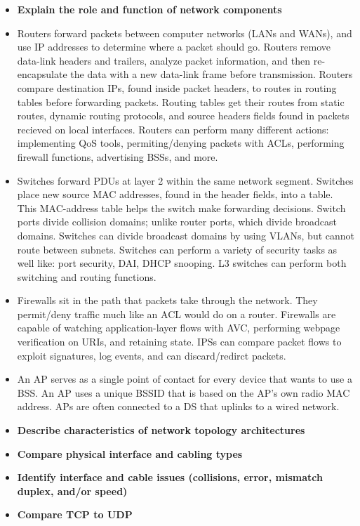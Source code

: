 \documentclass{article}
\begin{document}
\begin{itemize}
  \item \textbf{Explain the role and function of network components}
  	\item[] Routers forward packets between computer networks (LANs and WANs), and use IP addresses to determine where a packet should go. Routers remove data-link headers and trailers, analyze packet information, and then re-encapsulate the data with a new data-link frame before transmission. Routers compare destination IPs, found inside packet headers, to routes in routing tables before forwarding packets. Routing tables get their routes from static routes, dynamic routing protocols, and source headers fields found in packets recieved on local interfaces. Routers can perform many different actions: implementing QoS tools, permiting/denying packets with ACLs, performing firewall functions, advertising BSSs, and more. 
	\item[] Switches forward PDUs at layer 2 within the same network segment. Switches place new source MAC addresses, found in the header fields, into a table. This MAC-address table helps the switch make forwarding decisions. Switch ports divide collision domains; unlike router ports, which divide broadcast domains. Switches can divide broadcast domains by using VLANs, but cannot route between subnets. Switches can perform a variety of security tasks as well like: port security, DAI, DHCP snooping. L3 switches can perform both switching and routing functions.
	\item[] Firewalls sit in the path that packets take through the network. They permit/deny traffic much like an ACL would do on a router. Firewalls are capable of watching application-layer flows with AVC, performing webpage verification on URIs, and retaining state. IPSs can compare packet flows to exploit signatures, log events, and can discard/redirct packets.
	\item[] An AP serves as a single point of contact for every device that wants to use a BSS. An AP uses a unique BSSID that is based on the AP's own radio MAC address. APs are often connected to a DS that uplinks to a wired network.
  \item \textbf{Describe characteristics of network topology architectures}
  \item \textbf{Compare physical interface and cabling types}
  \item \textbf{Identify interface and cable issues (collisions, error, mismatch duplex, and/or speed)}
  \item \textbf{Compare TCP to UDP}

\end{itemize}
\end{document}
